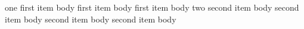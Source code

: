 \begin{itemize}
	\myitem one
	        first item body
	        first item body
	        first item body
	\myitem two
	        second item body
	        second item body
	        second item body
	        second item body
\end{itemize}
